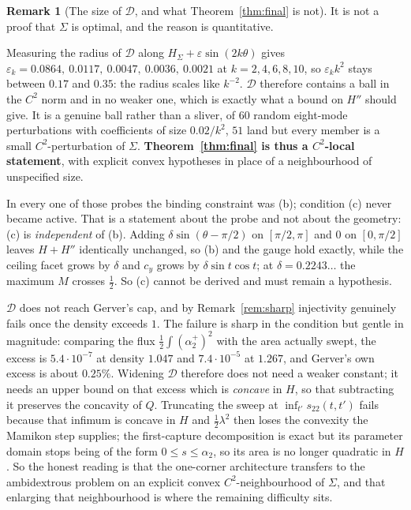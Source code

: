 \documentclass[11pt]{article}
\theoremstyle{definition}
\newtheorem{remark}[theorem]{Remark}
\newcommand{\Sig}{\Sigma}
\begin{document}
\begin{remark}[The size of $\mathcal D$, and what Theorem~\ref{thm:final} is not]
\label{rem:notopt}
It is not a proof that $\Sig$ is optimal, and the reason is quantitative.

Measuring the radius of $\mathcal D$ along $H_\Sig+\varepsilon\sin(2k\theta)$ gives
$\varepsilon_k=0.0864,\ 0.0117,\ 0.0047,\ 0.0036,\ 0.0021$ at $k=2,4,6,8,10$, so
$\varepsilon_kk^2$ stays between $0.17$ and $0.35$: the radius scales like $k^{-2}$.
$\mathcal D$ therefore contains a ball in the $C^2$ norm and in no weaker one, which is
exactly what a bound on $H''$ should give. It is a genuine ball rather than a sliver,
of $60$ random eight-mode perturbations with coefficients of size $0.02/k^2$, $51$ land
but every member is a small $C^2$-perturbation of $\Sig$.
\textbf{Theorem~\ref{thm:final} is thus a $C^2$-local statement}, with explicit convex
hypotheses in place of a neighbourhood of unspecified size.

In every one of those probes the binding constraint was (b); condition (c) never became
active. That is a statement about the probe and not about the geometry: (c) is
\emph{independent} of (b). Adding $\delta\sin(\theta-\pi/2)$ on $[\pi/2,\pi]$ and $0$ on
$[0,\pi/2]$ leaves $H+H''$ identically unchanged, so (b) and the gauge hold exactly, while
the ceiling facet grows by $\delta$ and $c_y$ grows by $\delta\sin t\cos t$; at
$\delta=0.2243\ldots$ the maximum $M$ crosses $\tfrac12$. So (c) cannot be derived and must
remain a hypothesis.

$\mathcal D$ does not reach Gerver's cap, and by Remark~\ref{rem:sharp} injectivity
genuinely fails once the density exceeds $1$. The failure is sharp in the condition but
gentle in magnitude: comparing the flux $\tfrac12\int(\alpha_2^+)^2$ with the area actually
swept, the excess is $5.4\cdot10^{-7}$ at density $1.047$ and $7.4\cdot10^{-5}$ at $1.267$,
and Gerver's own excess is about $0.25\%$. Widening $\mathcal D$ therefore does not need a
weaker constant; it needs an upper bound on that excess which is \emph{concave} in $H$, so
that subtracting it preserves the concavity of $Q$. Truncating the sweep at
$\inf_{t'}s_{22}(t,t')$ fails because that infimum is concave in $H$ and
$\tfrac12\lambda^2$ then loses the convexity the Mamikon step supplies; the first-capture
decomposition is exact but its parameter domain stops being of the form
$0\le s\le\alpha_2$, so its area is no longer quadratic in $H$.
So the honest reading is that the one-corner architecture transfers to the ambidextrous
problem on an explicit convex $C^2$-neighbourhood of $\Sig$, and that enlarging that
neighbourhood is where the remaining difficulty sits.
\end{remark}
\end{document}

